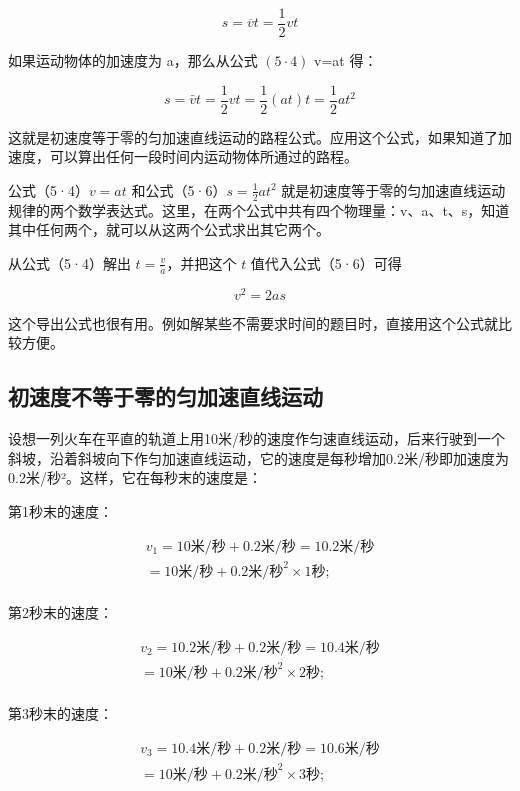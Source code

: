 \[
s = \overline {{v}} t = \frac {1}{2} v t \tag{5.5}
\]

如果运动物体的加速度为 a，那么从公式 \((5\cdot4)\) v=at 得：

\[
s = \bar {v} t = \frac {1}{2} v t = \frac {1}{2} (a t) t = \frac {1}{2} a t ^ {2} \tag{5.6}
\]

这就是初速度等于零的匀加速直线运动的路程公式。应用这个公式，如果知道了加速度，可以算出任何一段时间内运动物体所通过的路程。

公式（5·4）\(v=at\) 和公式（5·6）\(s=\frac{1}{2}at^{2}\)
就是初速度等于零的匀加速直线运动规律的两个数学表达式。这里，在两个公式中共有四个物理量：v、a、t、s，知道其中任何两个，就可以从这两个公式求出其它两个。

从公式（5·4）解出 \(t = \frac{v}{a}\)，并把这个 \(t\)
值代入公式（5·6）可得

\[
v ^ {2} = 2 a s \tag {5.7}
\]

这个导出公式也很有用。例如解某些不需要求时间的题目时，直接用这个公式就比较方便。

\subsection{初速度不等于零的匀加速直线运动}\label{ux521dux901fux5ea6ux4e0dux7b49ux4e8eux96f6ux7684ux5300ux52a0ux901fux76f4ux7ebfux8fd0ux52a8}

设想一列火车在平直的轨道上用10米/秒的速度作匀速直线运动，后来行驶到一个斜坡，沿着斜坡向下作匀加速直线运动，它的速度是每秒增加0.2米/秒即加速度为0.2米/秒²。这样，它在每秒末的速度是：

第1秒末的速度：

\[
\begin{array}{l} v _ {1} = 10 \text{米/秒} + 0.2 \text{米/秒} = 10.2 \text{米/秒} \\ = 10 \text{米/秒} + 0.2 \text{米/秒} ^ {2} \times 1 \text{秒}; \\ \end{array}
\]

第2秒末的速度：

\[
\begin{array}{l} v _ {2} = 10.2 \text{米/秒} + 0.2 \text{米/秒} = 10.4 \text{米/秒} \\ = 10 \text{米/秒} + 0.2 \text{米/秒} ^ {2} \times 2 \text{秒}; \\ \end{array}
\]

第3秒末的速度：

\[
\begin{array}{l} v _ {3} = 10.4 \text{米/秒} + 0.2 \text{米/秒} = 10.6 \text{米/秒} \\ = 10 \text{米/秒} + 0.2 \text{米/秒} ^ {2} \times 3 \text{秒}; \\ \end{array}
\]

